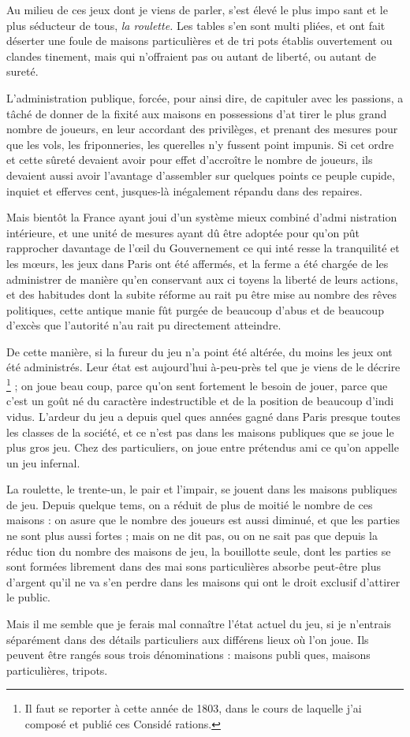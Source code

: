 Au milieu de ces jeux dont je viens
de parler, s'est élevé le plus impo%
sant et le plus séducteur de tous, \emph{la
roulette.} Les tables s'en sont multi%
pliées, et ont fait déserter une foule
de maisons particulières et de tri%
pots établis ouvertement ou clandes%
tinement, mais qui n'offraient pas
ou autant de liberté, ou autant de
sureté.

L'administration publique, forcée,
pour ainsi dire, de capituler avec les
passions, a tâché de donner de la
fixité aux maisons en possessions d'at%
tirer le plus grand nombre de joueurs,
en leur accordant des privilèges, et
prenant des mesures pour que les
vols, les friponneries, les querelles n'y
fussent point impunis. Si cet ordre et
cette sûreté devaient avoir pour effet
d'accroître le nombre de joueurs,
ils devaient aussi avoir l'avantage
d'assembler sur quelques points ce
peuple cupide, inquiet et efferves%
cent, jusques-là inégalement répandu
dans des repaires.

Mais bientôt la France ayant joui
d'un système mieux combiné d'admi%
nistration intérieure, et une unité de
mesures ayant dû être adoptée pour
qu'on pût rapprocher davantage de
l'{\oe}il du Gouvernement ce qui inté%
resse la tranquilité et les m{\oe}urs, les
jeux dans Paris ont été affermés, et la
ferme a été chargée de les administrer
de manière qu'en conservant aux ci%
toyens la liberté de leurs actions, et des
habitudes dont la subite réforme au%
rait pu être mise au nombre des rêves
politiques, cette antique manie fût
purgée de beaucoup d'abus et de 
beaucoup d'excès que l'autorité n'au%
rait pu directement atteindre.

De cette manière, si la fureur du
jeu n'a point été altérée, du moins les
jeux ont été administrés. Leur état
est aujourd'hui à-peu-près tel que je
viens de le décrire
\footnote{Il faut se reporter à cette année de 1803, dans le
  cours de laquelle j'ai composé et publié ces Considé%
rations.} ; on joue beau%
coup, parce qu'on sent fortement le
besoin de jouer, parce que c'est un
goût né du caractère indestructible
et de la position de beaucoup d'indi%
vidus. L'ardeur du jeu a depuis quel%
ques années gagné dans Paris presque
toutes les classes de la société, et ce
n'est pas dans les maisons publiques
que se joue le plus gros jeu. Chez des
particuliers, on joue entre prétendus
ami ce qu'on appelle un jeu infernal.

La roulette, le trente-un, le pair et
l'impair, se jouent dans les maisons
publiques de jeu. Depuis quelque
tems, on a réduit de plus de moitié
le nombre de ces maisons : on asure 
que le nombre des joueurs est aussi
diminué, et que les parties ne sont
plus aussi fortes ; mais on ne dit pas,
ou on ne sait pas que depuis la réduc%
tion du nombre des maisons de jeu,
la bouillotte seule, dont les parties se
sont formées librement dans des mai%
sons particulières  absorbe peut-être plus
d'argent qu'il ne va s'en perdre dans
les maisons qui ont le droit exclusif
d'attirer le public.

Mais il me semble que je ferais mal
connaître l'état actuel du jeu, si je
n'entrais séparément dans des détails
particuliers aux différens lieux où
l'on joue. Ils peuvent être rangés sous
trois dénominations : maisons publi%
ques, maisons particulières, tripots.
